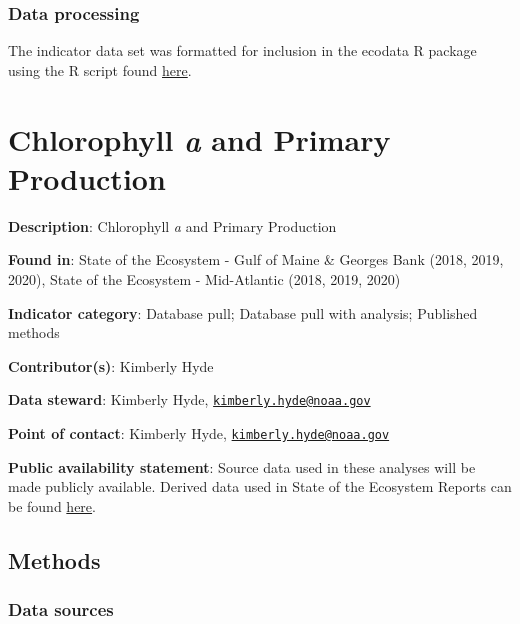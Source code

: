 \documentclass[
]{book}
\begin{document}
\hypertarget{data-processing-5}{%
\subsection{Data processing}\label{data-processing-5}}

The indicator data set was formatted for inclusion in the ecodata R package using the R script found \href{https://github.com/NOAA-EDAB/ecodata/blob/master/data-raw/get_ches_bay_wq.R}{here}.

\hypertarget{chl-pp}{%
\chapter{\texorpdfstring{Chlorophyll \emph{a} and Primary Production}{Chlorophyll a and Primary Production}}\label{chl-pp}}

\textbf{Description}: Chlorophyll \emph{a} and Primary Production

\textbf{Found in}: State of the Ecosystem - Gulf of Maine \& Georges Bank (2018, 2019, 2020), State of the Ecosystem - Mid-Atlantic (2018, 2019, 2020)

\textbf{Indicator category}: Database pull; Database pull with analysis; Published methods

\textbf{Contributor(s)}: Kimberly Hyde

\textbf{Data steward}: Kimberly Hyde, \href{mailto:kimberly.hyde@noaa.gov}{\nolinkurl{kimberly.hyde@noaa.gov}}

\textbf{Point of contact}: Kimberly Hyde, \href{mailto:kimberly.hyde@noaa.gov}{\nolinkurl{kimberly.hyde@noaa.gov}}

\textbf{Public availability statement}: Source data used in these analyses will be made publicly available. Derived data used in State of the Ecosystem Reports can be found \href{http://comet.nefsc.noaa.gov/erddap/info/index.html?page=1\&itemsPerPage=1000}{here}.

\hypertarget{methods-8}{%
\section{Methods}\label{methods-8}}

\hypertarget{data-sources-8}{%
\subsection{Data sources}\label{data-sources-8}}
\end{document}

